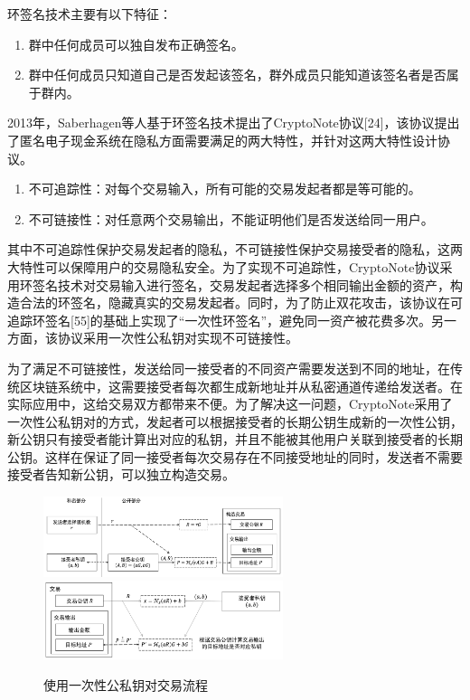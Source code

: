 环签名技术主要有以下特征：

\begin{enumerate}
	\item 群中任何成员可以独自发布正确签名。
	\item 群中任何成员只知道自己是否发起该签名，群外成员只能知道该签名者是否属于群内。
\end{enumerate}

2013年，Saberhagen等人基于环签名技术提出了CryptoNote协议[24]，该协议提出了匿名电子现金系统在隐私方面需要满足的两大特性，并针对这两大特性设计协议。

\begin{enumerate}
	\item 不可追踪性：对每个交易输入，所有可能的交易发起者都是等可能的。
	\item 不可链接性：对任意两个交易输出，不能证明他们是否发送给同一用户。
\end{enumerate}

其中不可追踪性保护交易发起者的隐私，不可链接性保护交易接受者的隐私，这两大特性可以保障用户的交易隐私安全。为了实现不可追踪性，CryptoNote协议采用环签名技术对交易输入进行签名，交易发起者选择多个相同输出金额的资产，构造合法的环签名，隐藏真实的交易发起者。同时，为了防止双花攻击，该协议在可追踪环签名[55]的基础上实现了“一次性环签名”，避免同一资产被花费多次。另一方面，该协议采用一次性公私钥对实现不可链接性。
	
为了满足不可链接性，发送给同一接受者的不同资产需要发送到不同的地址，在传统区块链系统中，这需要接受者每次都生成新地址并从私密通道传递给发送者。在实际应用中，这给交易双方都带来不便。为了解决这一问题，CryptoNote采用了一次性公私钥对的方式，发起者可以根据接受者的长期公钥生成新的一次性公钥，新公钥只有接受者能计算出对应的私钥，并且不能被其他用户关联到接受者的长期公钥。这样在保证了同一接受者每次交易存在不同接受地址的同时，发送者不需要接受者告知新公钥，可以独立构造交易。


\begin{figure}[ht]
  \centering%
    {\includegraphics[width=7cm]{figures/one-time-gen.png}}%
  \hspace{4em}%
  	{\includegraphics[width=7cm]{figures/one-time-verify.png}}
\caption{使用一次性公私钥对交易流程}
\label{fig:one-time-key}
\end{figure}

